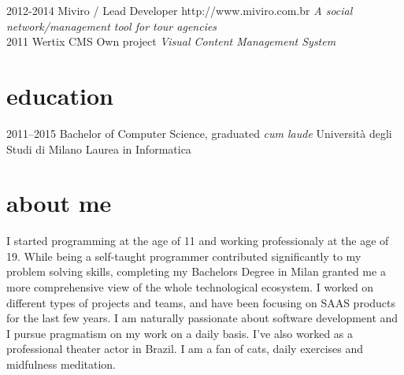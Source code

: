\documentclass[]{friggeri-cv} %
\begin{document}
\begin{entrylist}
\entry
{2012-2014}
{Miviro / Lead Developer}
{http://www.miviro.com.br}
{\emph{A social network/management tool for tour agencies} \\
}
\entry
{2011}
{Wertix CMS}
{Own project}
{\emph{Visual Content Management System} \\
}
\end{entrylist}


\section{education}
\begin{entrylist}
\entry
{2011--2015}
{Bachelor {\normalfont of Computer Science, graduated \textit{cum laude}}}
{Università degli Studi di Milano}
{Laurea in Informatica}
\end{entrylist}

\section{about me}
I started programming at the age of 11 and working professionaly at the age of 19.
While being a self-taught programmer contributed significantly to my problem
solving skills, completing my Bachelors Degree in Milan granted me a more
comprehensive view of the whole technological ecosystem. I worked on different
types of projects and teams, and have been focusing on SAAS products for the last
few years. I am naturally passionate about software development and I pursue
pragmatism on my work on a daily basis. I've also worked as a professional
theater actor in Brazil. I am a fan of cats, daily exercises and midfulness
meditation.
\end{document}

